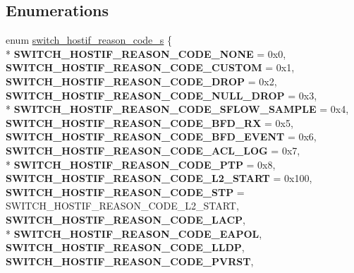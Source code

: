 \subsection*{Enumerations}
\begin{DoxyCompactItemize}
\item 
enum \hyperlink{group__HostInterface_ga4a81fc4f5f8643f528b3a45009b5ba84}{switch\+\_\+hostif\+\_\+reason\+\_\+code\+\_\+s} \{ \\*
{\bfseries S\+W\+I\+T\+C\+H\+\_\+\+H\+O\+S\+T\+I\+F\+\_\+\+R\+E\+A\+S\+O\+N\+\_\+\+C\+O\+D\+E\+\_\+\+N\+O\+N\+E} = 0x0, 
{\bfseries S\+W\+I\+T\+C\+H\+\_\+\+H\+O\+S\+T\+I\+F\+\_\+\+R\+E\+A\+S\+O\+N\+\_\+\+C\+O\+D\+E\+\_\+\+C\+U\+S\+T\+O\+M} = 0x1, 
{\bfseries S\+W\+I\+T\+C\+H\+\_\+\+H\+O\+S\+T\+I\+F\+\_\+\+R\+E\+A\+S\+O\+N\+\_\+\+C\+O\+D\+E\+\_\+\+D\+R\+O\+P} = 0x2, 
{\bfseries S\+W\+I\+T\+C\+H\+\_\+\+H\+O\+S\+T\+I\+F\+\_\+\+R\+E\+A\+S\+O\+N\+\_\+\+C\+O\+D\+E\+\_\+\+N\+U\+L\+L\+\_\+\+D\+R\+O\+P} = 0x3, 
\\*
{\bfseries S\+W\+I\+T\+C\+H\+\_\+\+H\+O\+S\+T\+I\+F\+\_\+\+R\+E\+A\+S\+O\+N\+\_\+\+C\+O\+D\+E\+\_\+\+S\+F\+L\+O\+W\+\_\+\+S\+A\+M\+P\+L\+E} = 0x4, 
{\bfseries S\+W\+I\+T\+C\+H\+\_\+\+H\+O\+S\+T\+I\+F\+\_\+\+R\+E\+A\+S\+O\+N\+\_\+\+C\+O\+D\+E\+\_\+\+B\+F\+D\+\_\+\+R\+X} = 0x5, 
{\bfseries S\+W\+I\+T\+C\+H\+\_\+\+H\+O\+S\+T\+I\+F\+\_\+\+R\+E\+A\+S\+O\+N\+\_\+\+C\+O\+D\+E\+\_\+\+B\+F\+D\+\_\+\+E\+V\+E\+N\+T} = 0x6, 
{\bfseries S\+W\+I\+T\+C\+H\+\_\+\+H\+O\+S\+T\+I\+F\+\_\+\+R\+E\+A\+S\+O\+N\+\_\+\+C\+O\+D\+E\+\_\+\+A\+C\+L\+\_\+\+L\+O\+G} = 0x7, 
\\*
{\bfseries S\+W\+I\+T\+C\+H\+\_\+\+H\+O\+S\+T\+I\+F\+\_\+\+R\+E\+A\+S\+O\+N\+\_\+\+C\+O\+D\+E\+\_\+\+P\+T\+P} = 0x8, 
{\bfseries S\+W\+I\+T\+C\+H\+\_\+\+H\+O\+S\+T\+I\+F\+\_\+\+R\+E\+A\+S\+O\+N\+\_\+\+C\+O\+D\+E\+\_\+\+L2\+\_\+\+S\+T\+A\+R\+T} = 0x100, 
{\bfseries S\+W\+I\+T\+C\+H\+\_\+\+H\+O\+S\+T\+I\+F\+\_\+\+R\+E\+A\+S\+O\+N\+\_\+\+C\+O\+D\+E\+\_\+\+S\+T\+P} = S\+W\+I\+T\+C\+H\+\_\+\+H\+O\+S\+T\+I\+F\+\_\+\+R\+E\+A\+S\+O\+N\+\_\+\+C\+O\+D\+E\+\_\+\+L2\+\_\+\+S\+T\+A\+R\+T, 
{\bfseries S\+W\+I\+T\+C\+H\+\_\+\+H\+O\+S\+T\+I\+F\+\_\+\+R\+E\+A\+S\+O\+N\+\_\+\+C\+O\+D\+E\+\_\+\+L\+A\+C\+P}, 
\\*
{\bfseries S\+W\+I\+T\+C\+H\+\_\+\+H\+O\+S\+T\+I\+F\+\_\+\+R\+E\+A\+S\+O\+N\+\_\+\+C\+O\+D\+E\+\_\+\+E\+A\+P\+O\+L}, 
{\bfseries S\+W\+I\+T\+C\+H\+\_\+\+H\+O\+S\+T\+I\+F\+\_\+\+R\+E\+A\+S\+O\+N\+\_\+\+C\+O\+D\+E\+\_\+\+L\+L\+D\+P}, 
{\bfseries S\+W\+I\+T\+C\+H\+\_\+\+H\+O\+S\+T\+I\+F\+\_\+\+R\+E\+A\+S\+O\+N\+\_\+\+C\+O\+D\+E\+\_\+\+P\+V\+R\+S\+T}, 

\end{DoxyCompactItemize}
